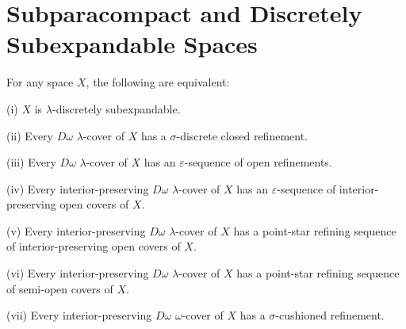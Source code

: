 \documentclass[jisng6ii.tex]{subfiles}
\begin{document}
\section{Subparacompact and Discretely Subexpandable Spaces} \label{sec:6.2}

{\theorem{\label{th:6.2.1}} For any space $X$, the following are equivalent:

\textup{(i)} $X$ is  $\lambda$-discretely subexpandable.

\textup{(ii)} Every $D\omega$ $\lambda$-cover of $X$ has a $\sigma$-discrete closed refinement.

\textup{(iii)}  Every $D\omega$ $\lambda$-cover of $X$ has an $\varepsilon$-sequence of open refinements.

\textup{(iv)} Every interior-preserving $D\omega$ $\lambda$-cover of $X$ has an 
$\varepsilon$-sequence of interior-preserving open covers of $X$.

\textup{(v)} Every interior-preserving $D\omega$ $\lambda$-cover of $X$ has a 
point-star refining sequence of interior-preserving  open covers of $X$.

\textup{(vi)} Every interior-preserving $D\omega$ $\lambda$-cover of $X$ has a 
point-star refining sequence of  semi-open covers of $X$.

\textup{(vii)}  Every interior-preserving  $D\omega$ $\omega$-cover of $X$ has a 
$\sigma$-cushioned refinement.
}
\end{document}
